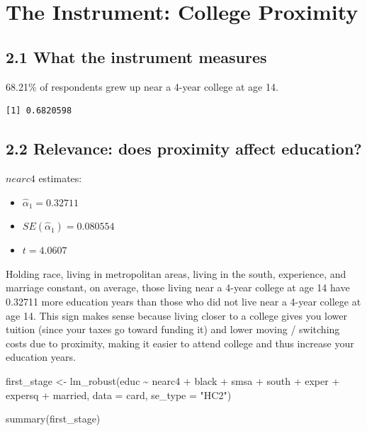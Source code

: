 \documentclass[
  letterpaper,
  DIV=11,
  numbers=noendperiod]{scrartcl}
\newenvironment{Shaded}{\begin{snugshade}}{\end{snugshade}}
\newcommand{\AttributeTok}[1]{\textcolor[rgb]{0.40,0.45,0.13}{#1}}
\newcommand{\FunctionTok}[1]{\textcolor[rgb]{0.28,0.35,0.67}{#1}}
\newcommand{\NormalTok}[1]{\textcolor[rgb]{0.00,0.23,0.31}{#1}}
\newcommand{\OtherTok}[1]{\textcolor[rgb]{0.00,0.23,0.31}{#1}}
\newcommand{\SpecialCharTok}[1]{\textcolor[rgb]{0.37,0.37,0.37}{#1}}
\newcommand{\StringTok}[1]{\textcolor[rgb]{0.13,0.47,0.30}{#1}}
\begin{document}
\newpage

\section{The Instrument: College
Proximity}\label{the-instrument-college-proximity}

\subsection{2.1 What the instrument
measures}\label{what-the-instrument-measures}

68.21\% of respondents grew up near a 4-year college at age 14.

\begin{Shaded}
\end{Shaded}

\begin{verbatim}
[1] 0.6820598
\end{verbatim}

\subsection{2.2 Relevance: does proximity affect
education?}\label{relevance-does-proximity-affect-education}

\(nearc4\) estimates:

\begin{itemize}
\item $\hat{\alpha}_1 = 0.32711$
\item $SE(\hat{\alpha}_1) = 0.080554$
\item $t = 4.0607$
\end{itemize}

Holding race, living in metropolitan areas, living in the south,
experience, and marriage constant, on average, those living near a
4-year college at age 14 have 0.32711 more education years than those
who did not live near a 4-year college at age 14. This sign makes sense
because living closer to a college gives you lower tuition (since your
taxes go toward funding it) and lower moving / switching costs due to
proximity, making it easier to attend college and thus increase your
education years.

\begin{Shaded}
\begin{Highlighting}[]
\NormalTok{first\_stage }\OtherTok{\textless{}{-}} \FunctionTok{lm\_robust}\NormalTok{(educ }\SpecialCharTok{\textasciitilde{}}\NormalTok{ nearc4 }\SpecialCharTok{+}\NormalTok{ black }\SpecialCharTok{+}\NormalTok{ smsa }\SpecialCharTok{+}\NormalTok{ south }\SpecialCharTok{+}\NormalTok{ exper }\SpecialCharTok{+}\NormalTok{ expersq }
                         \SpecialCharTok{+}\NormalTok{ married, }\AttributeTok{data =}\NormalTok{ card, }\AttributeTok{se\_type =} \StringTok{"HC2"}\NormalTok{)}

\FunctionTok{summary}\NormalTok{(first\_stage)}
\end{Highlighting}
\end{Shaded}
\end{document}
